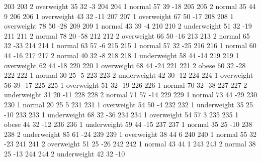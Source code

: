 \begin{Schunk}
\begin{Soutput}
		203         203   2  overweight  35         32           -3
		204         204   1      normal  57         39          -18
		205         205   2      normal  35         44            9
		206         206   1  overweight  43         32          -11
		207         207   1  overweight  67         50          -17
		208         208   1  overweight  78         50          -28
		209         209   1      normal  43         39           -4
		210         210   2 underweight  51         32          -19
		211         211   2      normal  78         20          -58
		212         212   2  overweight  66         50          -16
		213         213   2      normal  65         32          -33
		214         214   1      normal  63         57           -6
		215         215   1      normal  57         32          -25
		216         216   1      normal  60         44          -16
		217         217   2      normal  40         32           -8
		218         218   1 underweight  58         44          -14
		219         219   1  overweight  62         44          -18
		220         220   1  overweight  68         44          -24
		221         221   2       obese  60         32          -28
		222         222   1      normal  30         25           -5
		223         223   2 underweight  42         30          -12
		224         224   1  overweight  56         39          -17
		225         225   1  overweight  51         32          -19
		226         226   1      normal  70         32          -38
		227         227   2 underweight  31         20          -11
		228         228   2      normal  71         57          -14
		229         229   1      normal  73         44          -29
		230         230   1      normal  20         25            5
		231         231   1  overweight  54         50           -4
		232         232   1 underweight  35         25          -10
		233         233   1 underweight  68         32          -36
		234         234   1  overweight  54         57            3
		235         235   1       obese  44         32          -12
		236         236   1 underweight  59         44          -15
		237         237   1      normal  35         25          -10
		238         238   2 underweight  85         61          -24
		239         239   1  overweight  38         44            6
		240         240   1      normal  55         32          -23
		241         241   2  overweight  51         25          -26
		242         242   1      normal  43         44            1
		243         243   2      normal  38         25          -13
		244         244   2 underweight  42         32          -10

\end{Soutput}
\end{Schunk}
